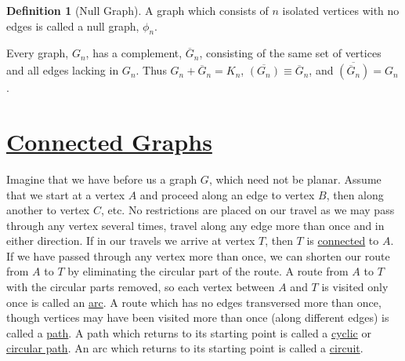 \documentclass[12pt, letterpaper, onecolumn, conference, final]{IEEEtran}
\theoremstyle{definition}
\newtheorem{definition}{Definition}[section]
\theoremstyle{plain}
\begin{document}
\begin{center}
{\begin{minipage}{7.3 in}
\begin{definition}[Null Graph]
A graph which consists of $n$ isolated vertices with no edges is called a null graph, $\phi_n$.
\end{definition}
\end{minipage}}
\end{center}

\begin{center}
\end{center}

\noindent
Every graph, $G_n$, has a complement, $\overline{G}_n$, consisting of the same set of vertices and all edges lacking in $G_n$. Thus $G_n + \overline{G}_n = K_n$, $\overline{(G_n)} \equiv \overline{G}_n$, and $\overline{(\overline{G}_n)} = G_n$.

\newpage
\section{\textbf{\underline{Connected Graphs}}}
\vspace{.3cm}
\noindent
Imagine that we have before us a graph $G$, which need not be planar. Assume that we start at a vertex $A$ and proceed along an edge to vertex $B$, then along another to vertex $C$, etc. No restrictions are placed on our travel as we may pass through any vertex several times, travel along any edge more than once and in either direction. If in our travels we arrive at vertex $T$, then $T$ is \underline{connected} to $A$. If we have passed through any vertex more than once, we can shorten our route from $A$ to $T$ by eliminating the circular part of the route. A route from $A$ to $T$ with the circular parts removed, so each vertex between $A$ and $T$ is visited only once is called an \underline{arc}. A route which has no edges transversed more than once, though vertices may have been visited more than once (along different edges) is called a \underline{path}. A path which returns to its starting point is called a \underline{cyclic} or \underline{circular path}. An arc which returns to its starting point is called a \underline{circuit}.
\end{document}
